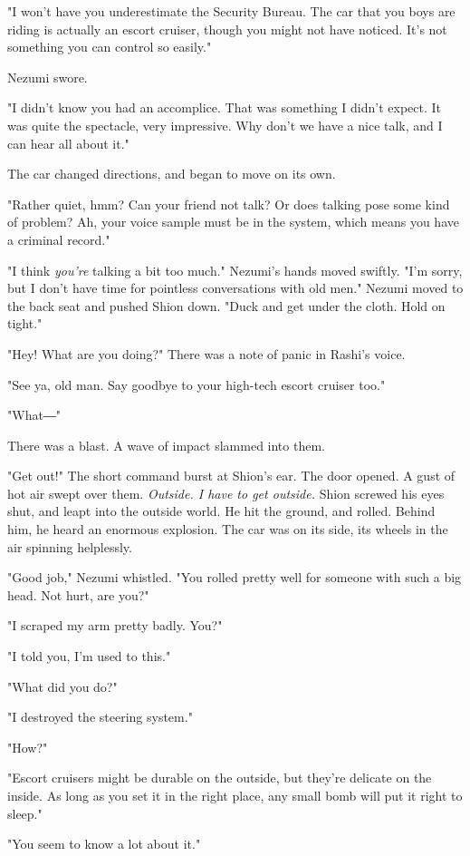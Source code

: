 "I won't have you underestimate the Security Bureau. The car that you
boys are riding is actually an escort cruiser, though you might not have
noticed. It's not something you can control so easily."

Nezumi swore.

"I didn't know you had an accomplice. That was something I didn't
expect. It was quite the spectacle, very impressive. Why don't we have a
nice talk, and I can hear all about it."

The car changed directions, and began to move on its own.

"Rather quiet, hmm? Can your friend not talk? Or does talking pose some
kind of problem? Ah, your voice sample must be in the system, which
means you have a criminal record."

"I think \emph{you're} talking a bit too much." Nezumi's hands moved swiftly.
"I'm sorry, but I don't have time for pointless conversations with old
men." Nezumi moved to the back seat and pushed Shion down. "Duck and get
under the cloth. Hold on tight."

"Hey! What are you doing?" There was a note of panic in Rashi's voice.

"See ya, old man. Say goodbye to your high-tech escort cruiser too."

"What―"

There was a blast. A wave of impact slammed into them.

"Get out!" The short command burst at Shion's ear. The door opened. A
gust of hot air swept over them. \emph{Outside. I have to get outside.} Shion
screwed his eyes shut, and leapt into the outside world. He hit the
ground, and rolled. Behind him, he heard an enormous explosion. The car
was on its side, its wheels in the air spinning helplessly.

"Good job," Nezumi whistled. "You rolled pretty well for someone with
such a big head. Not hurt, are you?"

"I scraped my arm pretty badly. You?"

"I told you, I'm used to this."

"What did you do?"

"I destroyed the steering system."

"How?"

"Escort cruisers might be durable on the outside, but they're delicate
on the inside. As long as you set it in the right place, any small bomb
will put it right to sleep."

"You seem to know a lot about it."

